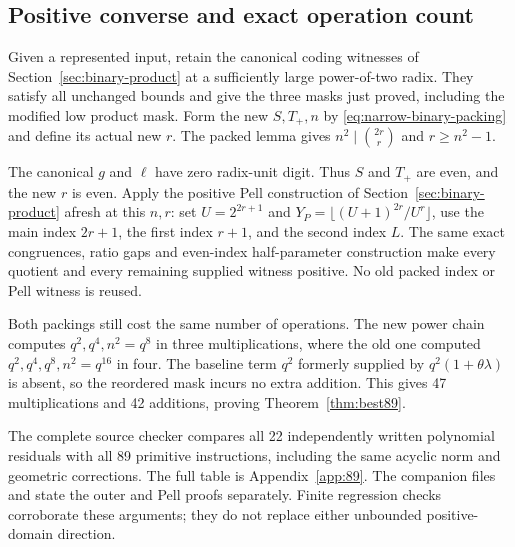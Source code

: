\subsection{Positive converse and exact operation count}

Given a represented input, retain the canonical coding witnesses of
Section~\ref{sec:binary-product} at a sufficiently large power-of-two
radix. They satisfy all unchanged bounds and give the three masks
just proved, including the modified low product mask. Form the new
$S,T_+,n$ by \eqref{eq:narrow-binary-packing} and define its actual
new $r$. The packed lemma gives
$n^2\mid\binom{2r}{r}$ and $r\ge n^2-1$.

The canonical $g$ and $\ell$ have zero radix-unit digit. Thus $S$
and $T_+$ are even, and the new $r$ is even. Apply the positive
Pell construction of Section~\ref{sec:binary-product} afresh at this
$n,r$: set $U=2^{2r+1}$ and
$Y_P=\lfloor(U+1)^{2r}/U^r\rfloor$, use the main index $2r+1$,
the first index $r+1$, and the second index $L$. The same exact
congruences, ratio gaps and even-index half-parameter construction
make every quotient and every remaining supplied witness positive.
No old packed index or Pell witness is reused.

Both packings still cost the same number of operations. The new
power chain computes $q^2,q^4,n^2=q^8$ in three multiplications,
where the old one computed $q^2,q^4,q^8,n^2=q^{16}$ in four.
The baseline term $q^2$ formerly supplied by
$q^2(1+\theta\lambda)$ is absent, so the reordered mask incurs no
extra addition. This gives 47 multiplications and 42 additions,
proving Theorem~\ref{thm:best89}.

The complete source checker compares all 22 independently written
polynomial residuals with all 89 primitive instructions, including
the same acyclic norm and geometric corrections. The full table is
Appendix~\ref{app:89}. The companion files
 and
 state the outer and Pell proofs
separately. Finite regression checks corroborate these arguments;
they do not replace either unbounded positive-domain direction.
